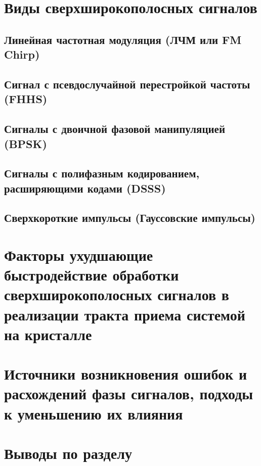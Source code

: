 \section{Виды сверхширокополосных сигналов}

\subsection{Линейная частотная модуляция (ЛЧМ или FM Chirp)}

\subsection{Сигнал с псевдослучайной перестройкой частоты (FHHS)}

\subsection{Сигналы с двоичной фазовой манипуляцией (BPSK)}

\subsection{Сигналы с полифазным кодированием, расширяющими кодами (DSSS)}

\subsection{Сверхкороткие импульсы (Гауссовские импульсы)}

\section{Факторы ухудшающие быстродействие обработки сверхширокополосных сигналов в реализации тракта приема системой на кристалле}

\section{Источники возникновения ошибок и расхождений фазы сигналов, подходы к уменьшению их влияния}

\section{Выводы по разделу}